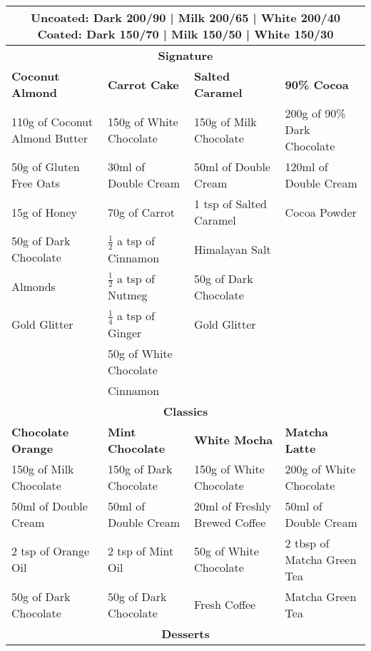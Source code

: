 \documentclass[11pt, english]{article}
\begin{document}
	\begin{center}
		\scriptsize
	\begin{longtable}{p{4cm}p{4cm}p{4cm}p{4cm}}
	        \multicolumn{4}{c}{\textbf{Uncoated:} Dark 200/90 | Milk 200/65 | White 200/40 \textbf{Coated:} Dark 150/70 | Milk 150/50 | White 150/30}\\
	        \hline
	        \hline
	        \multicolumn{4}{c}{\textbf{Signature}}\\
	        \hline
	        \hline
	        \textbf{Coconut Almond} & \textbf{Carrot Cake} & \textbf{Salted Caramel} & \textbf{90\% Cocoa}\\
	        \hline
	        110g of Coconut Almond Butter & 150g of White Chocolate & 150g of Milk Chocolate & 200g of 90\% Dark Chocolate\\
	        50g of Gluten Free Oats & 30ml of Double Cream & 50ml of Double Cream & 120ml of Double Cream\\
	        15g of Honey & 70g of Carrot & 1 tsp of Salted Caramel & Cocoa Powder\\
	        50g of Dark Chocolate & $\frac{1}{2}$ a tsp of Cinnamon & Himalayan Salt & \\
	        Almonds & $\frac{1}{2}$ a tsp of Nutmeg & 50g of Dark Chocolate & \\
	        Gold Glitter & $\frac{1}{4}$ a tsp of Ginger & Gold Glitter & \\
	        & 50g of White Chocolate & & \\
	        & Cinnamon & & \\
	        \hline
	        \hline
	        \multicolumn{4}{c}{\textbf{Classics}}\\
	        \hline
	        \hline
	        \textbf{Chocolate Orange} & \textbf{Mint Chocolate} & \textbf{White Mocha} & \textbf{Matcha Latte}\\
	        \hline
		150g of Milk Chocolate & 150g of Dark Chocolate & 150g of White Chocolate & 200g of White Chocolate\\
	        50ml of Double Cream & 50ml of Double Cream & 20ml of Freshly Brewed Coffee & 50ml of Double Cream\\
	        2 tsp of Orange Oil & 2 tsp of Mint Oil & 50g of White Chocolate & 2 tbsp of Matcha Green Tea\\
	        50g of Dark Chocolate & 50g of Dark Chocolate & Fresh Coffee & Matcha Green Tea\\
	        \hline
	        \hline
	        \multicolumn{4}{c}{\textbf{Desserts}}\\

\end{longtable}
\end{center}
\end{document}
